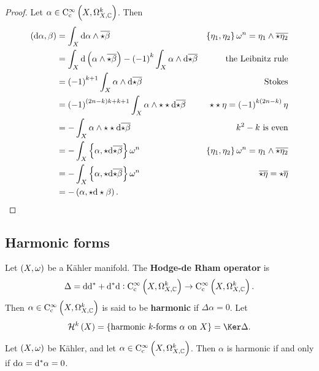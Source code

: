 
\begin{proof}
Let $ \alpha \in \C_\c^\infty\br{X, \Omega_{X, \CC}^k} $. Then
\begin{align*}
\br{\d\alpha, \beta}
& = \int_X \d\alpha \wedge \overline{\star\beta} & \cbr{\eta_1, \eta_2}\omega^n = \eta_1 \wedge \overline{\star\eta_2} \\
& = \int_X \d\br{\alpha \wedge \overline{\star\beta}} - \br{-1}^k\int_X \alpha \wedge \d\overline{\star\beta} & \text{the Leibnitz rule} \\
& = \br{-1}^{k + 1}\int_X \alpha \wedge \d\overline{\star\beta} & \text{Stokes} \\
& = \br{-1}^{\br{2n - k}k + k + 1}\int_X \alpha \wedge \star\star\d\overline{\star\beta} & \star\star\eta = \br{-1}^{k\br{2n - k}}\eta \\
& = -\int_X \alpha \wedge \star\star\d\overline{\star\beta} & k^2 - k \ \text{is even} \\
& = -\int_X \cbr{\alpha, \star\d\overline{\star\beta}}\omega^n & \cbr{\eta_1, \eta_2}\omega^n = \eta_1 \wedge \overline{\star\eta_2} \\
& = -\int_X \cbr{\alpha, \star\d\overline{\star\beta}}\omega^n & \overline{\star\eta} = \star\overline{\eta} \\
& = -\br{\alpha, \star\d\star\beta}.
\end{align*}
\end{proof}

\pagebreak

\subsection{Harmonic forms}

\begin{definition}
Let $ \br{X, \omega} $ be a K\"ahler manifold. The \textbf{Hodge-de Rham operator} is
$$ \Delta = \d\d^* + \d^*\d : \C_\c^\infty\br{X, \Omega_{X, \CC}^k} \to \C_\c^\infty\br{X, \Omega_{X, \CC}^k}. $$
Then $ \alpha \in \C_\c^\infty\br{X, \Omega_{X, \CC}^k} $ is said to be \textbf{harmonic} if $ \Delta\alpha = 0 $. Let
$$ \HHH^k\br{X} = \cbr{\text{harmonic $ k $-forms} \ \alpha \ \text{on} \ X} = \Ker \Delta. $$
\end{definition}

\begin{lemma}
\label{lem:6.13}
Let $ \br{X, \omega} $ be K\"ahler, and let $ \alpha \in \C_\c^\infty\br{X, \Omega_{X, \CC}^k} $. Then $ \alpha $ is harmonic if and only if $ \mathrm{d}\alpha = \mathrm{d}^*\alpha = 0 $.
\end{lemma}


